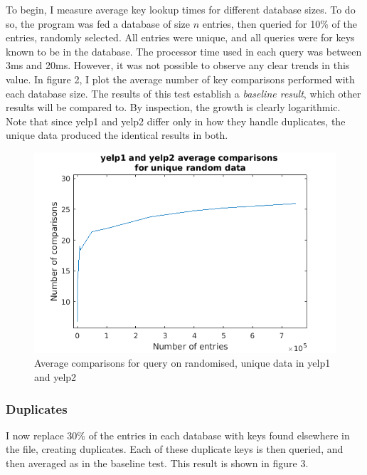 \documentclass[australian,english]{article}
\begin{document}
To begin, I measure average key lookup times for different database
sizes. To do so, the program was fed a database of size $n$ entries,
then queried for 10\% of the entries, randomly selected. All entries
were unique, and all queries were for keys known to be in the database.
The processor time used in each query was between 3ms and 20ms. However,
it was not possible to observe any clear trends in this value. In
figure 2, I plot the average number of key comparisons performed with
each database size. The results of this test establish a \textit{baseline
result}, which other results will be compared to. By inspection, the
growth is clearly logarithmic. Note that since yelp1 and yelp2 differ
only in how they handle duplicates, the unique data produced the identical
results in both.

\begin{figure}
\includegraphics[scale=0.8]{figs/baseresult}

\caption{Average comparisons for query on randomised, unique data in yelp1
and yelp2 }

\end{figure}


\subsubsection*{Duplicates}

I now replace 30\% of the entries in each database with keys found
elsewhere in the file, creating duplicates. Each of these duplicate
keys is then queried, and then averaged as in the baseline test. This
result is shown in figure 3.
\end{document}

